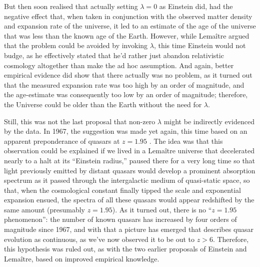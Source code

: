\documentclass[12 pt]{article}
\begin{document}
But then \citet{Lemaitre1933} soon realised that actually setting  $\lambda=0$ as Einstein did, had the negative effect that, when taken in conjunction with the observed matter density and expansion rate of the universe, it led to an estimate of the age of the universe that was less than the known age of the Earth. However, while Lema\^{i}tre argued that the problem could be avoided by invoking $\lambda$, this time Einstein would not budge, as he effectively stated that he'd rather just abandon relativistic cosmology altogether than make the ad hoc assumption. And again, better empirical evidence did show that there actually was no problem, as it turned out that the measured expansion rate was too high by an order of magnitude, and the age-estimate was consequently too low by an order of magnitude; therefore, the Universe could be older than the Earth without the need for $\lambda$.

Still, this was not the last proposal that non-zero $\lambda$ might be indirectly evidenced by the data. In 1967, the suggestion was made yet again, this time based on an apparent preponderance of quasars at $z=1.95$ \citep{Petrosian1967,Shklovsky1967,Kardashev1967}. The idea was that this observation could be explained if we lived in a Lema\^{i}tre universe that decelerated nearly to a halt at its ``Einstein radius,'' paused there for a very long time so that light previously emitted by distant quasars would develop a prominent absorption spectrum as it passed through the intergalactic medium of quasi-static space, so that, when the cosmological constant finally tipped the scale and exponential expansion ensued, the spectra of all these quasars would appear redshifted by the same amount (presumably $z=1.95$). As it turned out, there is no ``$z=1.95$ phenomenon'': the number of known quasars has increased by four orders of magnitude since 1967, and with that a picture has emerged that describes quasar evolution as continuous, as we've now observed it to be out to $z>6$. Therefore, this hypothesis was ruled out, as with the two earlier proposals of Einstein and Lema\^{i}tre, based on improved empirical knowledge. 
\end{document}
